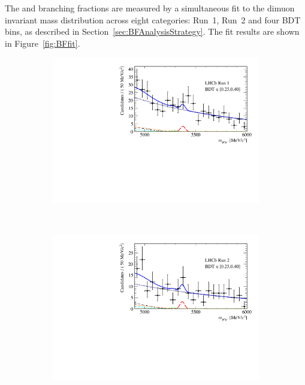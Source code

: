 {{%
The \bsmumu and \bdmumu branching fractions are measured by a simultaneous fit to the dimuon invariant mass distribution across eight categories: Run~1, Run~2 and four BDT bins, as described in Section~\ref{sec:BFAnalysisStrategy}. %
The fit results are shown in Figure~\ref{fig:BFfit}.

\begin{figure}[tbp]
    \centering
    \begin{subfigure}[b]{0.48\textwidth}
        \includegraphics[width=\textwidth]{./Figs/BFAnalysis/Fig17a.pdf}
    \end{subfigure}
    ~ %
    \begin{subfigure}[b]{0.48\textwidth}
       \includegraphics[width=\textwidth]{./Figs/BFAnalysis/Fig17e.pdf}

\end{subfigure}
\end{figure}}}
